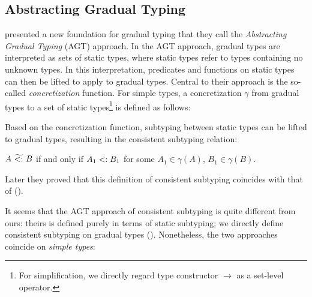 \subsection{Abstracting Gradual Typing}
\label{subsec:agt}

\citet{garcia2016abstracting} presented a new foundation for gradual typing that
they call the \textit{Abstracting Gradual Typing} (AGT) approach. In the AGT
approach, gradual types are interpreted as sets of static types, where static
types refer to types containing no unknown types. In this interpretation,
predicates and functions on static types can then be lifted to apply to gradual
types. Central to their approach is the so-called \textit{concretization}
function. For simple types, a concretization $\gamma$ from gradual types to a
set of static types\footnote{For simplification, we directly regard type
  constructor $\to$ as a set-level operator.} is defined as follows:
\begin{mdef}[Concretization]
  \label{def:concret}
\end{mdef}

Based on the concretization function, subtyping between static types can be
lifted to gradual types, resulting in the consistent subtyping relation:
\begin{mdef}
  \label{def:agt-conssub}
  $A ~\widetilde{<:}~ B$ if and only if $A_1 <: B_1$ for some $A_1 \in \gamma(A)$, $B_1 \in \gamma(B)$.
\end{mdef}

\noindent Later they proved that this definition of consistent subtyping coincides with
that of \citet{siek2007gradual} ().

It seems that the AGT approach of consistent subtyping is quite different from
ours: theirs is defined purely in terms of static subtyping; we directly define
consistent subtyping on gradual types ().
Nonetheless, the two approaches coincide on \textit{simple types}:

